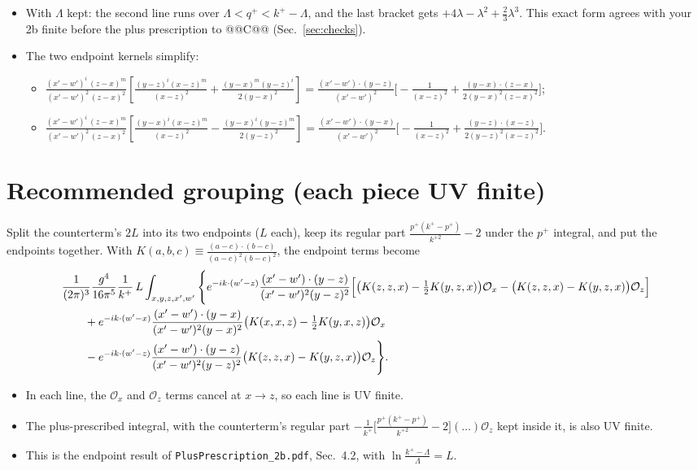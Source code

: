 \documentclass[10pt]{article}
\numberwithin{equation}{section}
\newcommand{\preE}{\frac{1}{(2\pi)^{3}}\frac{g^{4}}{16\pi^{5}}\frac{1}{k^{+}}}
\newcommand{\Kxw}{\frac{(x'-w')^{i}\,(z-x)^{m}}{(x'-w')^{2}\,(z-x)^{2}}}
\newcommand{\BB}{\left[\frac{(y-x)^{i}(x-z)^{m}}{(x-z)^{2}}-\frac{(y-x)^{i}(y-z)^{m}}{2(y-z)^{2}}\right]}
\newcommand{\BF}{\left[\frac{(y-z)^{i}(x-z)^{m}}{(x-z)^{2}}+\frac{(y-x)^{m}(y-z)^{i}}{2(y-x)^{2}}\right]}
\newcommand{\Ox}{\mathcal O_x}
\newcommand{\Oz}{\mathcal O_z}
\begin{document}
\begin{itemize}
\item With $\Lambda$ kept: the second line runs over $\Lambda<q^+<k^+-\Lambda$, and the last bracket gets $+4\lambda-\lambda^2+\frac23\lambda^3$. This exact form agrees with your 2b finite before the plus prescription to @@C@@ (Sec.~\ref{sec:checks}).
\item The two endpoint kernels simplify:
\begin{itemize}
\item $\Kxw\BF=\frac{(x'-w')\cdot(y-z)}{(x'-w')^2}\Big[-\frac{1}{(x-z)^2}+\frac{(y-x)\cdot(z-x)}{2(y-x)^2(z-x)^2}\Big]$;
\item $\Kxw\BB=\frac{(x'-w')\cdot(y-x)}{(x'-w')^2}\Big[-\frac{1}{(x-z)^2}+\frac{(y-z)\cdot(x-z)}{2(y-z)^2(x-z)^2}\Big]$.
\end{itemize}
\end{itemize}

\section{Recommended grouping (each piece UV finite)}\label{sec:group}
Split the counterterm's $2L$ into its two endpoints ($L$ each), keep its regular part $\frac{p^+(k^+-p^+)}{k^{+2}}-2$ under the $p^+$ integral, and put the endpoints together. With $K(a,b,c)\equiv\frac{(a-c)\cdot(b-c)}{(a-c)^2(b-c)^2}$, the endpoint terms become
\begin{align}
&\preE\,L\int_{x,y,z,x',w'}\Bigg\{e^{-ik\cdot(w'-z)}\frac{(x'-w')\cdot(y-z)}{(x'-w')^{2}(y-z)^{2}}\Big[\big(K(z,z,x)-\tfrac12K(y,z,x)\big)\Ox-\big(K(z,z,x)-K(y,z,x)\big)\Oz\Big]\notag\\
&\qquad+e^{-ik\cdot(w'-x)}\frac{(x'-w')\cdot(y-x)}{(x'-w')^{2}(y-x)^{2}}\big(K(x,x,z)-\tfrac12K(y,x,z)\big)\Ox\notag\\
&\qquad-e^{-ik\cdot(w'-z)}\frac{(x'-w')\cdot(y-z)}{(x'-w')^{2}(y-z)^{2}}\big(K(z,z,x)-K(y,z,x)\big)\Oz\Bigg\}.
\label{eq:endgroup}
\end{align}
\begin{itemize}
\item In each line, the $\Ox$ and $\Oz$ terms cancel at $x\to z$, so each line is UV finite.
\item The plus-prescribed integral, with the counterterm's regular part $-\frac{1}{k^+}\big[\frac{p^+(k^+-p^+)}{k^{+2}}-2\big](\dots)\Oz$ kept inside it, is also UV finite.
\item This is the endpoint result of \texttt{PlusPrescription\_2b.pdf}, Sec.~4.2, with $\ln\frac{k^+-\Lambda}{\Lambda}=L$.
\end{itemize}
\end{document}
